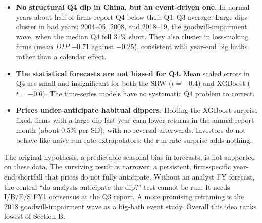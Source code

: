 \begin{itemize}
\item \textbf{No structural Q4 dip in China, but an event-driven one.} In normal years about half of firms report
  Q4 below their Q1--Q3 average. Large dips cluster in bad years: 2004--05, 2008, and 2018--19, the goodwill-impairment
  wave, when the median Q4 fell 31\% short. They also cluster in loss-making firms (mean $DIP$ $-0.71$ against
  $-0.25$), consistent with year-end big baths rather than a calendar effect.
\item \textbf{The statistical forecasts are not biased for Q4.} Mean scaled errors in Q4 are small and insignificant
  for both the SRW ($t=-0.4$) and XGBoost ($t=-0.6$). The time-series models have no systematic Q4 problem to
  correct.
\item \textbf{Prices under-anticipate habitual dippers.} Holding the XGBoost surprise fixed, firms with a large dip
  last year earn lower returns in the annual-report month (about 0.5\% per SD), with no reversal afterwards.
  Investors do not behave like naive run-rate extrapolators: the run-rate surprise adds nothing.
\end{itemize}

The original hypothesis, a predictable seasonal bias in forecasts, is not supported on these data. The surviving
result is narrower: a persistent, firm-specific year-end shortfall that prices do not fully anticipate. Without an
analyst FY forecast, the central ``do analysts anticipate the dip?'' test cannot be run. It needs I/B/E/S FY1
consensus at the Q3 report. A more promising reframing is the 2018 goodwill-impairment wave as a big-bath event
study. Overall this idea ranks lowest of Section B.

